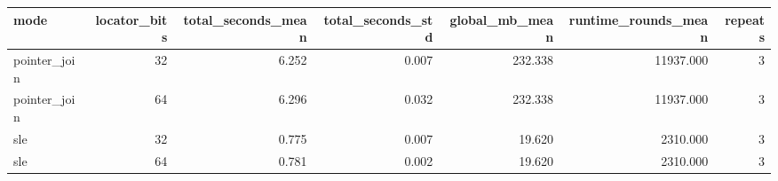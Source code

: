 \begin{tabular}{lrrrrrr}
\toprule
mode & locator_bits & total_seconds_mean & total_seconds_std & global_mb_mean & runtime_rounds_mean & repeats \\
\midrule
pointer_join & 32 & 6.252 & 0.007 & 232.338 & 11937.000 & 3 \\
pointer_join & 64 & 6.296 & 0.032 & 232.338 & 11937.000 & 3 \\
sle & 32 & 0.775 & 0.007 & 19.620 & 2310.000 & 3 \\
sle & 64 & 0.781 & 0.002 & 19.620 & 2310.000 & 3 \\
\bottomrule
\end{tabular}
